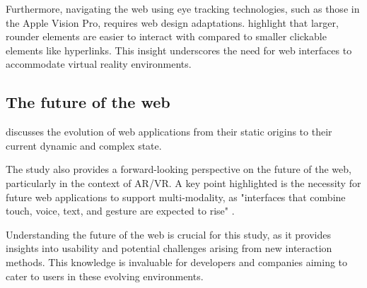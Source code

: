 Furthermore, navigating the web using eye tracking technologies, such as those in the Apple Vision Pro, requires web design adaptations. \cite{video:apple2024spatialweb} highlight that larger, rounder elements are easier to interact with compared to smaller clickable elements like hyperlinks. This insight underscores the need for web interfaces to accommodate virtual reality environments.


\subsection{The future of the web}

\cite{art:web-evolution-revolution-2024} discusses the evolution of web applications from their static origins to their current dynamic and complex state.

The study also provides a forward-looking perspective on the future of the web, particularly in the context of AR/VR. A key point highlighted is the necessity for future web applications to support multi-modality, as "interfaces that combine touch, voice, text, and gesture are expected to rise" \citep{art:web-evolution-revolution-2024}.

Understanding the future of the web is crucial for this study, as it provides insights into usability and potential challenges arising from new interaction methods. This knowledge is invaluable for developers and companies aiming to cater to users in these evolving environments.

